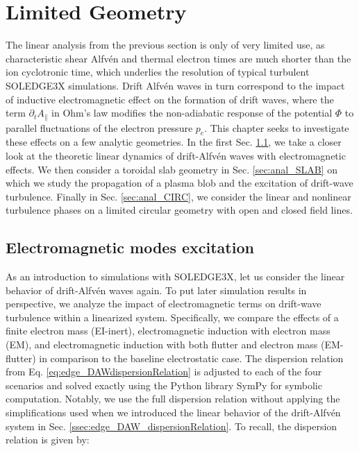 \chapter{Limited Geometry}
\label{chap:analSimulations}


The linear analysis from the previous section is only of very limited use, as characteristic shear Alfvén and thermal electron times are much shorter than the ion cyclotronic time, which underlies the resolution of typical turbulent SOLEDGE3X simulations. Drift Alfvén waves in turn correspond to the impact of inductive electromagnetic effect on the formation of drift waves, where the term $\partial_t A_\parallel$ in Ohm's law modifies the non-adiabatic response of the potential $\Phi$ to parallel fluctuations of the electron pressure $p_e$. This chapter seeks to investigate these effects on a few analytic geometries. In the first Sec. \ref{sec:anal_DAW_modeExcitation}, we take a closer look at the theoretic linear dynamics of drift-Alfvén waves with electromagnetic effects. We then consider a toroidal slab geometry in Sec. \ref{sec:anal_SLAB} on which we study the propagation of a plasma blob and the excitation of drift-wave turbulence. Finally in Sec. \ref{sec:anal_CIRC}, we consider the linear and nonlinear turbulence phases on a limited circular geometry with open and closed field lines.


\section{Electromagnetic modes excitation}
\label{sec:anal_DAW_modeExcitation}

As an introduction to simulations with SOLEDGE3X, let us consider the linear behavior of drift-Alfvén waves again. To put later simulation results in perspective, we analyze the impact of electromagnetic terms on drift-wave turbulence within a linearized system. Specifically, we compare the effects of a finite electron mass (EI-inert), electromagnetic induction with electron mass (EM), and electromagnetic induction with both flutter and electron mass (EM-flutter) in comparison to the baseline electrostatic case. The dispersion relation from Eq. \ref{eq:edge_DAWdispersionRelation} is adjusted to each of the four scenarios and solved exactly using the Python library SymPy for symbolic computation. Notably, we use the full dispersion relation without applying the simplifications used when we introduced the linear behavior of the drift-Alfvén system in Sec. \ref{ssec:edge_DAW_dispersionRelation}. To recall, the dispersion relation is given by: 

